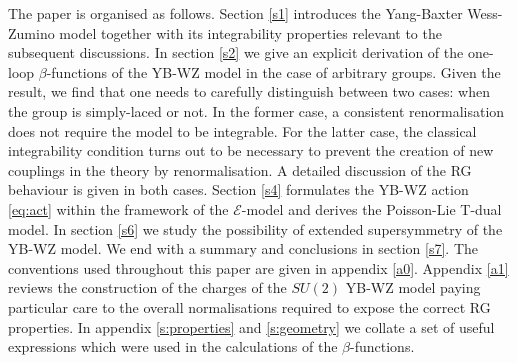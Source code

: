 \documentclass[12pt]{article}
\begin{document}
The paper is organised as follows. Section \ref{s1} introduces the Yang-Baxter Wess-Zumino model together with its integrability properties relevant to the subsequent discussions. In section \ref{s2} we give an explicit derivation of the one-loop $\beta$-functions of the YB-WZ model in the case of arbitrary groups. Given the result, we find that one needs to carefully distinguish between two cases: when the group is simply-laced or not. In the former case, a consistent renormalisation does not require the model to be integrable. For the latter case, the classical integrability condition turns out to be necessary to prevent the creation of new couplings in the theory by renormalisation. A detailed discussion of the RG behaviour is given in both cases. Section \ref{s4} formulates the YB-WZ action \eqref{eq:act} within the framework of the $\mathcal E$-model and derives the Poisson-Lie T-dual model. In section \ref{s6} we study the possibility of extended supersymmetry of the YB-WZ model. We end with a summary and conclusions in section \ref{s7}. The conventions used throughout this paper are given in appendix \ref{a0}. Appendix \ref{a1} reviews the construction \cite{Kawaguchi:2013gma} of the charges of the $SU(2)$ YB-WZ model  paying particular care to the overall normalisations required to expose the correct RG properties. In appendix \ref{s:properties} and \ref{s:geometry} we collate a set of useful expressions which were used in the calculations of the $\beta$-functions. 
 
\end{document}

